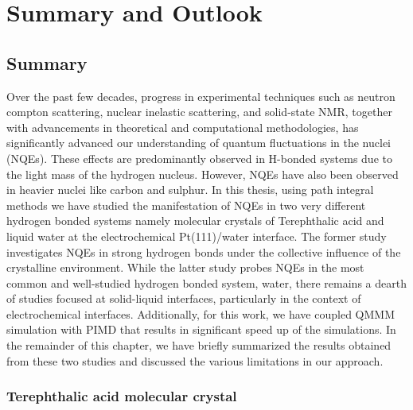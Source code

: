 \chapter{Summary and Outlook}\label{summary}
\graphicspath{{Introduction/IntroductionFigs/}}

\section{Summary}

Over the past few decades, progress in experimental techniques such as neutron compton scattering, nuclear inelastic scattering, and solid-state NMR, together with advancements in theoretical and computational methodologies, has significantly advanced our understanding of quantum fluctuations in the nuclei (NQEs). These effects are predominantly observed in H-bonded systems due to the light mass of the hydrogen nucleus\cite{markland2018nuclear,li2011quantum,ceriotti2016nuclear}. However, NQEs have also been observed in heavier nuclei like carbon and sulphur\cite{kundu2021quantum,kundu2022influence,zheng2022nuclear}. In this thesis, using path integral methods we have studied the manifestation of NQEs in two very different hydrogen bonded systems namely molecular crystals of Terephthalic acid and liquid water at the electrochemical Pt(111)/water interface. The former study investigates NQEs in strong hydrogen bonds under the collective influence of the crystalline environment. While the latter study probes NQEs in the most common and well-studied hydrogen bonded system, water\cite{ceriotti2012efficient}, there remains a dearth of studies focused at solid-liquid interfaces, particularly in the context of electrochemical interfaces\cite{litman2018decisive,lan2020ionization,tian2022visualizing,yan2020nuclear}. Additionally, for this work, we have coupled QMMM simulation with PIMD that results in significant speed up of the simulations. In the remainder of this chapter, we have briefly summarized the results obtained from these two studies and discussed the various limitations in our approach. 

\subsection{Terephthalic acid molecular crystal}

